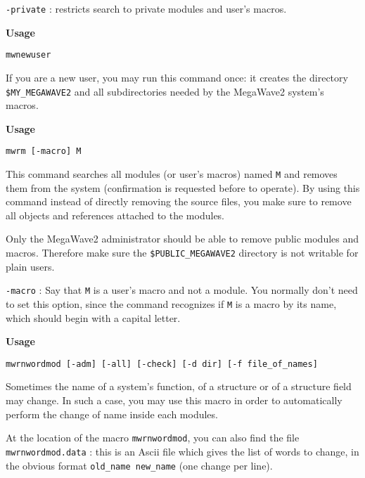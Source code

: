 \verb+-private+ : restricts search to private modules and user's macros.

\newpage

{\Large\bf Usage} \bigskip

\verb+mwnewuser+

\Next

\Description
If you are a new user, you may run this command once: it creates the directory
\verb+$MY_MEGAWAVE2+ and all subdirectories needed by the MegaWave2 system's macros.

\newpage

{\Large\bf Usage} \bigskip

\verb+mwrm [-macro] M+

\Next

\Description
This command searches all modules (or user's macros) named \verb+M+ and removes
them from the system (confirmation is requested before to operate).
By using this command instead of directly removing the source files, you make
sure to remove all objects and references attached to the modules.

Only the MegaWave2 administrator should be able to remove public modules and macros.
Therefore make sure the \verb+$PUBLIC_MEGAWAVE2+ directory is not writable for plain
users.

\Next

\Options

\verb+-macro+ : Say that  \verb+M+ is a user's macro and not a module.
You normally don't need to set this option, since the command recognizes if 
\verb+M+ is a macro by its name, which should begin with a capital letter. 
        
\newpage

{\Large\bf Usage} \bigskip

\verb+mwrnwordmod [-adm] [-all] [-check] [-d dir] [-f file_of_names]+

\Next

\Description
Sometimes the name of a system's function, of a structure or of a
structure field may change. In such a case, you may use this macro in order to
automatically perform the change of name inside each modules.

At the location of the macro \verb+mwrnwordmod+, you can also find the
file \verb+mwrnwordmod.data+ : this is an Ascii file which gives the list of
words to change, in the obvious format \verb+old_name new_name+ (one change
per line).

